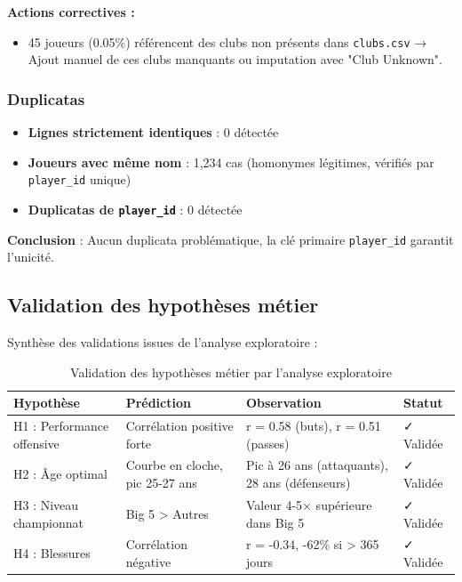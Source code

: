 \documentclass[12pt,a4paper]{article}
\begin{document}
\textbf{Actions correctives :}

\begin{itemize}[leftmargin=*]
    \item 45 joueurs (0.05\%) référencent des clubs non présents dans \texttt{clubs.csv} → Ajout manuel de ces clubs manquants ou imputation avec "Club Unknown".
\end{itemize}

\subsubsection{Duplicatas}

\begin{itemize}[leftmargin=*]
    \item \textbf{Lignes strictement identiques} : 0 détectée
    \item \textbf{Joueurs avec même nom} : 1,234 cas (homonymes légitimes, vérifiés par \texttt{player\_id} unique)
    \item \textbf{Duplicatas de \texttt{player\_id}} : 0 détectée
\end{itemize}

\textbf{Conclusion} : Aucun duplicata problématique, la clé primaire \texttt{player\_id} garantit l'unicité.

\subsection{Validation des hypothèses métier}

Synthèse des validations issues de l'analyse exploratoire :

\begin{table}[h]
\centering
\begin{tabular}{@{}p{3cm}p{4cm}p{4cm}l@{}}
\toprule
\textbf{Hypothèse} & \textbf{Prédiction} & \textbf{Observation} & \textbf{Statut} \\ \midrule
H1 : Performance offensive & Corrélation positive forte & r = 0.58 (buts), r = 0.51 (passes) & ✓ Validée \\[0.3cm]
H2 : Âge optimal & Courbe en cloche, pic 25-27 ans & Pic à 26 ans (attaquants), 28 ans (défenseurs) & ✓ Validée \\[0.3cm]
H3 : Niveau championnat & Big 5 > Autres & Valeur 4-5× supérieure dans Big 5 & ✓ Validée \\[0.3cm]
H4 : Blessures & Corrélation négative & r = -0.34, -62\% si > 365 jours & ✓ Validée \\ \bottomrule
\end{tabular}
\caption{Validation des hypothèses métier par l'analyse exploratoire}
\end{table}
\end{document}
